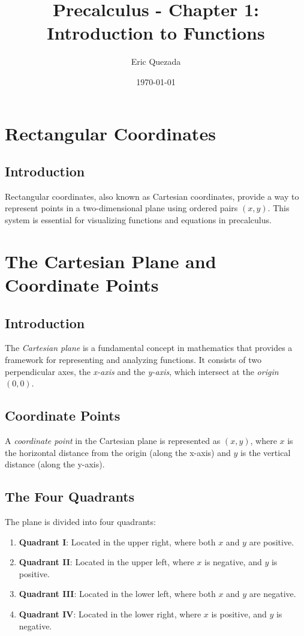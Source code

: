 \documentclass{article}
\title{Precalculus - Chapter 1: Introduction to Functions}
\author{Eric Quezada}
\date{\today}
\begin{document}
\maketitle

\section{Rectangular Coordinates}

\subsection{Introduction}

Rectangular coordinates, also known as Cartesian coordinates, provide a way to represent points in a two-dimensional plane using ordered pairs $(x, y)$. This system is essential for visualizing functions and equations in precalculus.

\section{The Cartesian Plane and Coordinate Points}

\subsection{Introduction}

The \emph{Cartesian plane} is a fundamental concept in mathematics that provides a framework for representing and analyzing functions. It consists of two perpendicular axes, the \emph{x-axis} and the \emph{y-axis}, which intersect at the \emph{origin} $(0, 0)$.

\subsection{Coordinate Points}

A \emph{coordinate point} in the Cartesian plane is represented as $(x, y)$, where $x$ is the horizontal distance from the origin (along the x-axis) and $y$ is the vertical distance (along the y-axis).

\subsection{The Four Quadrants}

The plane is divided into four quadrants:

\begin{enumerate}
    \item \textbf{Quadrant I}: Located in the upper right, where both $x$ and $y$ are positive.
    \item \textbf{Quadrant II}: Located in the upper left, where $x$ is negative, and $y$ is positive.
    \item \textbf{Quadrant III}: Located in the lower left, where both $x$ and $y$ are negative.
    \item \textbf{Quadrant IV}: Located in the lower right, where $x$ is positive, and $y$ is negative.
\end{enumerate}
\end{document}

